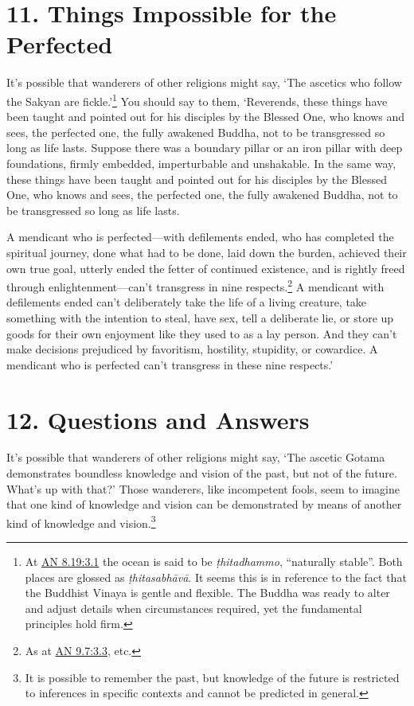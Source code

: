 \documentclass[12pt,openany]{book}%
\begin{document}
\section*{11. Things Impossible for the Perfected }

It’s possible that wanderers of other religions might say, ‘The ascetics who follow the Sakyan are fickle.’\footnote{At \href{https://suttacentral.net/an8.19/en/sujato\#3.1}{AN 8.19:3.1} the ocean is said to be \textit{\textsanskrit{ṭhitadhammo}}, “naturally stable”. Both places are glossed as \textit{\textsanskrit{ṭhitasabhāvā}}. It seems this is in reference to the fact that the Buddhist Vinaya is gentle and flexible. The Buddha was ready to alter and adjust details when circumstances required, yet the fundamental principles hold firm. } You should say to them, ‘Reverends, these things have been taught and pointed out for his disciples by the Blessed One, who knows and sees, the perfected one, the fully awakened Buddha, not to be transgressed so long as life lasts. Suppose there was a boundary pillar or an iron pillar with deep foundations, firmly embedded, imperturbable and unshakable. In the same way, these things have been taught and pointed out for his disciples by the Blessed One, who knows and sees, the perfected one, the fully awakened Buddha, not to be transgressed so long as life lasts. 

A mendicant who is perfected—with defilements ended, who has completed the spiritual journey, done what had to be done, laid down the burden, achieved their own true goal, utterly ended the fetter of continued existence, and is rightly freed through enlightenment—can’t transgress in nine respects.\footnote{As at \href{https://suttacentral.net/an9.7/en/sujato\#3.3}{AN 9.7:3.3}, etc. } A mendicant with defilements ended can’t deliberately take the life of a living creature, take something with the intention to steal, have sex, tell a deliberate lie, or store up goods for their own enjoyment like they used to as a lay person. And they can’t make decisions prejudiced by favoritism, hostility, stupidity, or cowardice. A mendicant who is perfected can’t transgress in these nine respects.’ 

\section*{12. Questions and Answers }

It’s possible that wanderers of other religions might say, ‘The ascetic Gotama demonstrates boundless knowledge and vision of the past, but not of the future. What’s up with that?’ Those wanderers, like incompetent fools, seem to imagine that one kind of knowledge and vision can be demonstrated by means of another kind of knowledge and vision.\footnote{It is possible to remember the past, but knowledge of the future is restricted to inferences in specific contexts and cannot be predicted in general. } 
\end{document}
